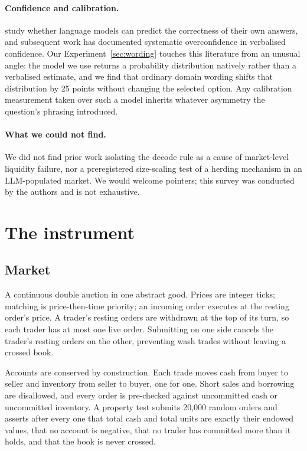 \documentclass[11pt]{article}
\begin{document}
\paragraph{Confidence and calibration.} \citet{kadavath2022} study whether
language models can predict the correctness of their own answers, and
subsequent work has documented systematic overconfidence in verbalised
confidence. Our Experiment~\ref{sec:wording} touches this literature from an
unusual angle: the model we use returns a probability distribution natively
rather than a verbalised estimate, and we find that ordinary domain wording
shifts that distribution by 25 points without changing the selected option.
Any calibration measurement taken over such a model inherits whatever asymmetry
the question's phrasing introduced.

\paragraph{What we could not find.} We did not find prior work isolating the
decode rule as a cause of market-level liquidity failure, nor a preregistered
size-scaling test of a herding mechanism in an LLM-populated market. We would
welcome pointers; this survey was conducted by the authors and is not
exhaustive.

\section{The instrument}

\subsection{Market}

A continuous double auction in one abstract good. Prices are integer ticks;
matching is price-then-time priority; an incoming order executes at the resting
order's price. A trader's resting orders are withdrawn at the top of its turn,
so each trader has at most one live order. Submitting on one side cancels the
trader's resting orders on the other, preventing wash trades without leaving a
crossed book.

Accounts are conserved by construction. Each trade moves cash from buyer to
seller and inventory from seller to buyer, one for one. Short sales and
borrowing are disallowed, and every order is pre-checked against uncommitted
cash or uncommitted inventory. A property test submits 20{,}000 random orders
and asserts after every one that total cash and total units are exactly their
endowed values, that no account is negative, that no trader has committed more
than it holds, and that the book is never crossed.
\end{document}
